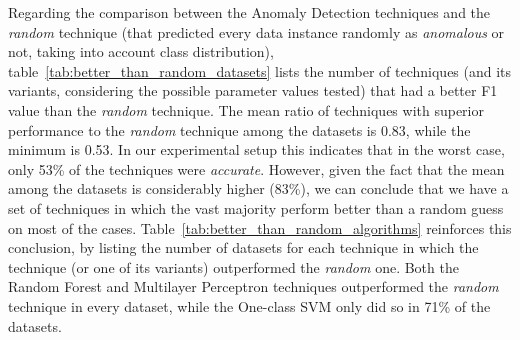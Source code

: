 Regarding the comparison between the Anomaly Detection techniques and the \textit{random} technique (that predicted every data instance randomly as \textit{anomalous} or not, taking into account class distribution), table~\ref{tab:better_than_random_datasets} lists the number of techniques (and its variants, considering the possible parameter values tested) that had a better F1 value than the \textit{random} technique.
The mean ratio of techniques with superior performance to the \textit{random} technique among the datasets is 0.83, while the minimum is 0.53.
In our experimental setup this indicates that in the worst case, only 53\% of the techniques were \textit{accurate}. However, given the fact that the mean among the datasets is considerably higher (83\%), we can conclude that we have a set of techniques in which the vast majority perform better than a random guess on most of the cases.
Table~\ref{tab:better_than_random_algorithms} reinforces this conclusion, by listing the number of datasets for each technique in which the technique (or one of its variants) outperformed the \textit{random} one.
Both the Random Forest and Multilayer Perceptron techniques outperformed the \textit{random} technique in every dataset, while the One-class SVM only did so in 71\% of the datasets.

